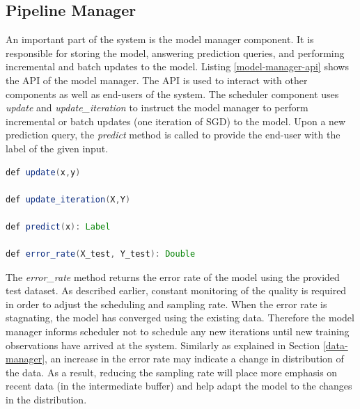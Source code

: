 \subsection{Pipeline Manager} \label{model-manager} 
An important part of the system is the model manager component.
It is responsible for storing the model, answering prediction queries, and performing incremental and batch updates to the model.
Listing \ref{model-manager-api} shows the API of the model manager.
The API is used to interact with other components as well as end-users of the system.
The scheduler component uses \textit{update} and \textit{update\_iteration} to instruct the model manager to perform incremental or batch updates (one iteration of SGD) to the model.
Upon a new prediction query, the \textit{predict} method is called to provide the end-user with the label of the given input.

\noindent\begin{minipage}[t]{\linewidth}
\begin{lstlisting}[language=java, basicstyle=\small\ttfamily, frame=tb ,columns=fullflexible,
showstringspaces=false,label=model-manager-api,caption=Model Manager API, numberstyle=\tiny]
def update(x,y)

def update_iteration(X,Y)

def predict(x): Label

def error_rate(X_test, Y_test): Double

\end{lstlisting}
\end{minipage}


The \textit{error\_rate} method returns the error rate of the model using the provided test dataset.
As described earlier, constant monitoring of the quality is required in order to adjust the scheduling and sampling rate.
When the error rate is stagnating, the model has converged using the existing data.
Therefore the model manager informs scheduler not to schedule any new iterations until new training observations have arrived at the system.
Similarly as explained in Section \ref{data-manager}, an increase in the error rate may indicate a change in distribution of the data.
As a result, reducing the sampling rate will place more emphasis on recent data (in the intermediate buffer) and help adapt the model to the changes in the distribution.

